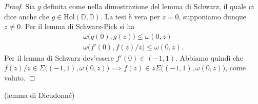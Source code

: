 \begin{proof}
  Sia $g$ definita come nella dimostrazione del lemma di Schwarz, il quale ci dice anche che $g \in \text{Hol}(\mathbb{D},\mathbb{D})$. La tesi è vera per $z=0$, supponiamo dunque $z\not=0$. Per il lemma di Schwarz-Pick si ha
  \begin{gather*}
    \omega\bigl(g(0),g(z)\bigr) \le \omega(0,z) \\
    \omega\bigl(f'(0),f(z)/z\bigr) \le \omega(0,z).
  \end{gather*}
  Per il lemma di Schwarz dev'essere $f'(0) \in (-1,1)$. Abbiamo quindi che $f(z)/z \in \Sigma\bigl((-1,1),\omega(0,z)\bigr) \implies f(z) \in z\Sigma\bigl((-1,1),\omega(0,z)\bigr)$, come voluto.
\end{proof}

\begin{lm}
  (lemma di Dieudonné)
\end{lm}
